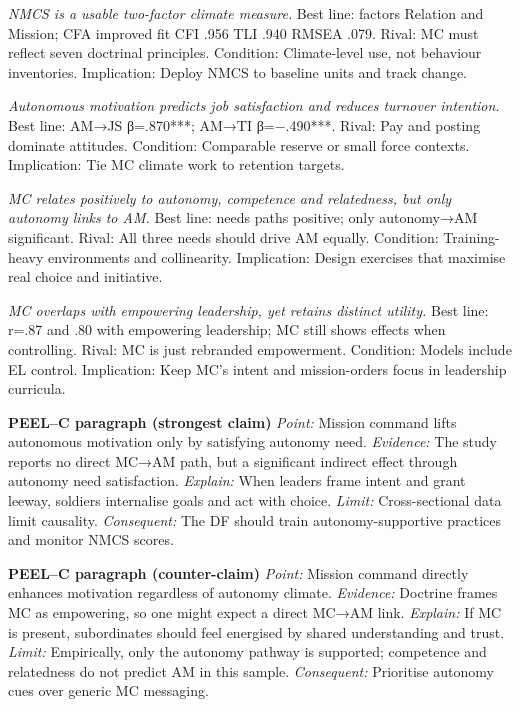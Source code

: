 \textit{NMCS is a usable two-factor climate measure.} Best line: factors Relation and Mission; CFA improved fit CFI .956 TLI .940 RMSEA .079. Rival: MC must reflect seven doctrinal principles. Condition: Climate-level use, not behaviour inventories. Implication: Deploy NMCS to baseline units and track change.

\textit{Autonomous motivation predicts job satisfaction and reduces turnover intention.} Best line: AM→JS β=.870***; AM→TI β=−.490***. Rival: Pay and posting dominate attitudes. Condition: Comparable reserve or small force contexts. Implication: Tie MC climate work to retention targets.

\textit{MC relates positively to autonomy, competence and relatedness, but only autonomy links to AM.} Best line: needs paths positive; only autonomy→AM significant. Rival: All three needs should drive AM equally. Condition: Training-heavy environments and collinearity. Implication: Design exercises that maximise real choice and initiative.

\textit{MC overlaps with empowering leadership, yet retains distinct utility.} Best line: r=.87 and .80 with empowering leadership; MC still shows effects when controlling. Rival: MC is just rebranded empowerment. Condition: Models include EL control. Implication: Keep MC’s intent and mission-orders focus in leadership curricula.

\textbf{PEEL–C paragraph (strongest claim)}
\textit{Point:} Mission command lifts autonomous motivation only by satisfying autonomy need.
\textit{Evidence:} The study reports no direct MC→AM path, but a significant indirect effect through autonomy need satisfaction.
\textit{Explain:} When leaders frame intent and grant leeway, soldiers internalise goals and act with choice.
\textit{Limit:} Cross-sectional data limit causality.
\textit{Consequent:} The DF should train autonomy-supportive practices and monitor NMCS scores.

\textbf{PEEL–C paragraph (counter-claim)}
\textit{Point:} Mission command directly enhances motivation regardless of autonomy climate.
\textit{Evidence:} Doctrine frames MC as empowering, so one might expect a direct MC→AM link.
\textit{Explain:} If MC is present, subordinates should feel energised by shared understanding and trust.
\textit{Limit:} Empirically, only the autonomy pathway is supported; competence and relatedness do not predict AM in this sample.
\textit{Consequent:} Prioritise autonomy cues over generic MC messaging.


